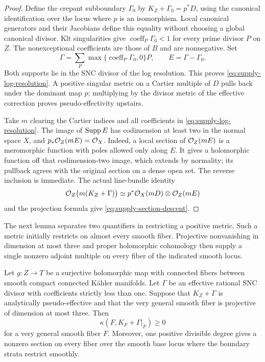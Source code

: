 \begin{proof}
Define the crepant subboundary $\Gamma_0$ by
$K_Z+\Gamma_0=p^*D$, using the canonical identification over the locus
where $p$ is an isomorphism.  Local canonical generators and their
Jacobians define this equality without choosing a global canonical
divisor.  Klt singularities give
$\operatorname{coeff}_P\Gamma_0<1$ for every prime divisor $P$ on $Z$.
The nonexceptional coefficients are those of $B$ and are nonnegative.
Set
\[
 \Gamma=\sum_P\max\{\operatorname{coeff}_P\Gamma_0,0\}P,
 \qquad E=\Gamma-\Gamma_0.
\]
Both supports lie in the SNC divisor of the log resolution.  This proves
\eqref{eq:supply-log-resolution}.  A positive singular metric on a
Cartier multiple of $D$ pulls back under the dominant map $p$; multiplying
by the divisor metric of the effective correction proves
pseudo-effectivity upstairs.

Take $m$ clearing the Cartier indices and all coefficients in
\eqref{eq:supply-log-resolution}.  The image of $\operatorname{Supp} E$ has codimension
at least two in the normal space $X$, and
$p_*\mathcal O_Z(mE)=\mathcal O_X$.  Indeed, a local section of $\mathcal O_Z(mE)$ is a
meromorphic function with poles allowed only along $E$.  It gives a
holomorphic function off that codimension-two image, which extends by
normality; its pullback agrees with the original section on a dense open
set.  The reverse inclusion is immediate.  The actual line-bundle
identity
\[
 \mathcal O_Z\bigl(m(K_Z+\Gamma)\bigr)
 \simeq p^*\mathcal O_X(mD)\otimes\mathcal O_Z(mE)
\]
and the projection formula give \eqref{eq:supply-section-descent}.
\end{proof}

The next lemma separates two quantifiers in restricting a positive
metric.  Such a metric initially restricts on almost every smooth
fiber.  Projective nonvanishing in dimension at most three and proper
holomorphic cohomology then supply a single nonzero adjoint multiple
on every fiber of the indicated smooth locus.

\begin{lemma}\label{lem:supply-fibers}
Let $g:Z\to T$ be a surjective holomorphic map with connected fibers
between smooth compact connected Kähler manifolds.  Let $\Gamma$ be an
effective rational SNC divisor with coefficients strictly less than one.
Suppose that $K_Z+\Gamma$ is analytically pseudo-effective and that the
very general smooth fiber is projective of dimension at most three.
Then
\[
 \kappa(F,K_F+\Gamma|_F)\geq0
\]
for a very general smooth fiber $F$.  Moreover, one positive divisible
degree gives a nonzero section on every fiber over the smooth base locus
where the boundary strata restrict smoothly.
\end{lemma}

